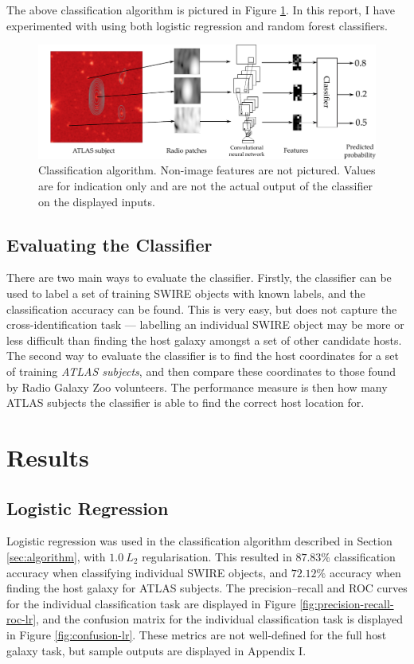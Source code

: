 \documentclass[a4paper]{article}
\newcommand{\fig}{Figure }
\newcommand{\sect}{Section }
\newcommand{\app}{Appendix }
\begin{document}
      The above classification algorithm is pictured in \fig \ref{fig:pipeline}. In this report, I have experimented with using both logistic regression and random forest classifiers.

      \begin{figure}[!ht]
        \centering
        \includegraphics[width=0.9\linewidth]{images/pipeline.pdf}
        \caption{Classification algorithm. Non-image features are not pictured. Values are for indication only and are not the actual output of the classifier on the displayed inputs.}
        \label{fig:pipeline}
      \end{figure}

    \subsection{Evaluating the Classifier}

      There are two main ways to evaluate the classifier. Firstly, the classifier can be used to label a set of training SWIRE objects with known labels, and the classification accuracy can be found. This is very easy, but does not capture the cross-identification task --- labelling an individual SWIRE object may be more or less difficult than finding the host galaxy amongst a set of other candidate hosts. The second way to evaluate the classifier is to find the host coordinates for a set of training \emph{ATLAS subjects}, and then compare these coordinates to those found by Radio Galaxy Zoo volunteers. The performance measure is then how many ATLAS subjects the classifier is able to find the correct host location for.

  \section{Results}

    \subsection{Logistic Regression}

      Logistic regression was used in the classification algorithm described in \sect \ref{sec:algorithm}, with $1.0\ L_2$ regularisation. This resulted in $87.83\%$ classification accuracy when classifying individual SWIRE objects, and $72.12\%$ accuracy when finding the host galaxy for ATLAS subjects. The precision--recall and ROC curves for the individual classification task are displayed in \fig \ref{fig:precision-recall-roc-lr}, and the confusion matrix for the individual classification task is displayed in \fig \ref{fig:confusion-lr}. These metrics are not well-defined for the full host galaxy task, but sample outputs are displayed in \app I.
\end{document}
